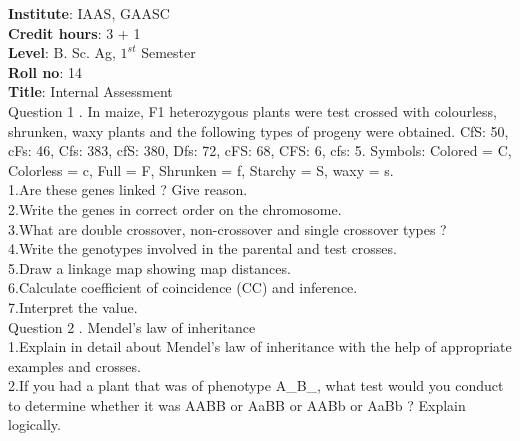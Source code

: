 \documentclass[12pt]{article}\usepackage[]{graphicx}\usepackage[]{color}
\begin{document}
{            \textbf{Institute}: IAAS, GAASC \\}\textbf{Credit hours}: 3 + 1 \\\textbf{Level}: B. Sc. Ag, $1^{st}$ Semester \\\textbf{Roll no}: 14 \\\textbf{Title}: Internal Assessment \\[1cm]Question 1 . In maize, F1 heterozygous plants were test crossed with colourless, shrunken, waxy plants and the following types of progeny were obtained. CfS: 50, cFs: 46, Cfs: 383, cfS: 380, Dfs: 72, cFS: 68, CFS: 6, cfs: 5. Symbols: Colored = C, Colorless = c, Full = F, Shrunken = f, Starchy = S, waxy = s. \\\hspace{0.5cm}1.Are these genes linked ? Give reason.\\\hspace{0.5cm}2.Write the genes in correct order on the chromosome.\\\hspace{0.5cm}3.What are double crossover, non-crossover and single crossover types ?\\\hspace{0.5cm}4.Write the genotypes involved in the parental and test crosses.\\\hspace{0.5cm}5.Draw a linkage map showing map distances.\\\hspace{0.5cm}6.Calculate coefficient of coincidence (CC) and inference.\\\hspace{0.5cm}7.Interpret the value.\\Question 2 . Mendel's law of inheritance \\\hspace{0.5cm}1.Explain in detail about Mendel's law of inheritance with the help of appropriate examples and crosses.\\\hspace{0.5cm}2.If you had a plant that was of phenotype A\_B\_, what test would you conduct to determine whether it was AABB or AaBB or AABb or AaBb ? Explain logically.\\\clearpage
\end{document}
